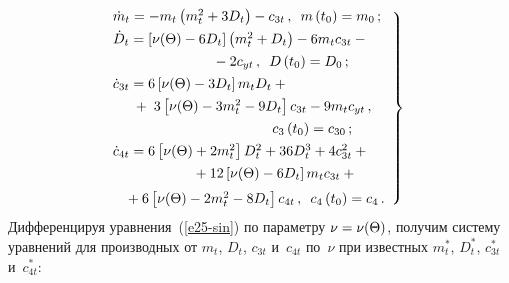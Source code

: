 \begin{multicols}{2}
\noindent
    \begin{equation}
    \left.
    \begin{array}{l}
    \hspace*{-3mm}\dot m_t = - m_t \left(m_t^2 + 3 D_t\right) - c_{3t}\,,\enskip
    m\left(t_0\right) = m_0\,;
\\[4pt]
        \hspace*{-3mm}\dot D_t = \left[ \nu(\Theta) - 6 D_t\right] \left(m_t^2 + D_t\right) -
    6 m_t c_{3t} -{}
\\[4pt]
\hspace*{22mm} {}-2 c_{yt}\,,\enskip D\left(t_0\right) = D_0\,;
\\[4pt]
        \hspace*{-3mm}\dot c_{3t} = 6\left[ \nu (\Theta) - 3 D_t\right] m_t D_t +{}\\[4pt]
\hspace*{2mm}{}+\;3 \left[ \nu(\Theta) - 3 m_t^2 - 9 D_t \right] c_{3t} - 9 m_t c_{yt}\,,\\[4pt]
\hspace{37mm}c_3 \left(t_0\right) = c_{30}\,;\\[4pt]
        \hspace*{-3mm}\dot c_{4t} = 6\left[ \nu(\Theta) + 2 m_t^2\right] D_t^2 +
    36 D_t^3 + 4 c_{3t}^2 +{}\\[4pt]
\hspace*{17mm}{}+ 12 \left[ \nu (\Theta) - 6 D_t\right] m_t c_{3t} +{}\\[6pt]
{}+ 6 \left[ \nu(\Theta) - 2 m_t^2 - 8 D_t \right]
c_{4t}\,,\enskip c_4 \left(t_0\right) = c_{4}\,.
\end{array}
\right\}
\label{e25-sin}
\end{equation}
Дифференцируя уравнения~(\ref{e25-sin}) по параметру $\nu\hm = \nu(\Theta)$,
получим систему уравнений для производных от  $m_t$, $D_t$, $c_{3t}$ и~$c_{4t}$
по~$\nu$ при известных
$m_t^*$, $D_t^*$, $c_{3t}^*$ и~$c_{4t}^*$:


\end{multicols}
